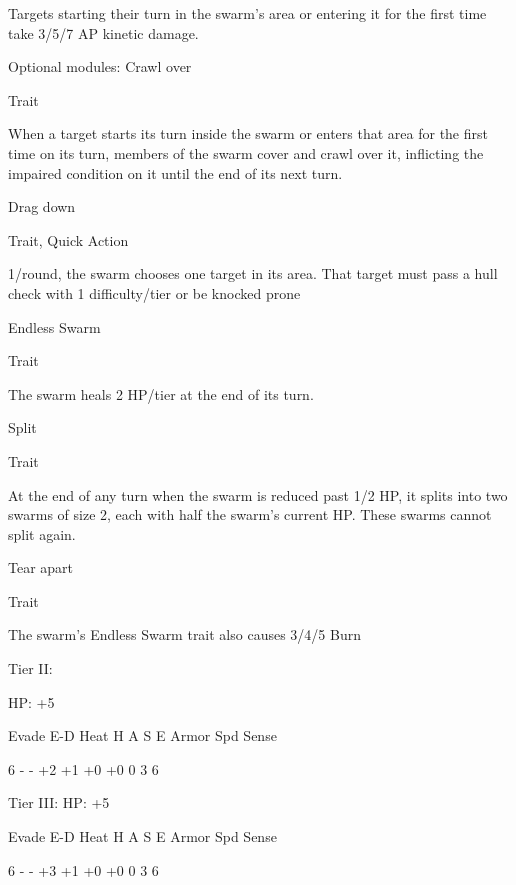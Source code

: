 Targets starting their turn in the swarm’s area or entering it for the first time take 3/5/7 AP kinetic
damage.





Optional modules:
Crawl over

Trait

When a target starts its turn inside the swarm or enters that area for the first time on its turn,
members of the swarm cover and crawl over it, inflicting the impaired condition on it until the end
of its next turn.


Drag down

Trait, Quick Action

1/round, the swarm chooses one target in its area. That target must pass a hull check with 1
difficulty/tier or be knocked prone


Endless Swarm

Trait

The swarm heals 2 HP/tier at the end of its turn.


Split

Trait

At the end of any turn when the swarm is reduced past 1/2 HP, it splits into two swarms of size 2,
each with half the swarm’s current HP. These swarms cannot split again.


Tear apart

Trait

The swarm’s Endless Swarm trait also causes 3/4/5 Burn


Tier II:

HP: +5


          Evade     E-D     Heat    H     A     S     E        Armor        Spd       Sense

          6         -       -       +2    +1    +0    +0       0            3         6

Tier III:
HP: +5


          Evade     E-D     Heat    H     A     S     E        Armor        Spd       Sense

          6         -       -       +3    +1    +0    +0       0            3         6

